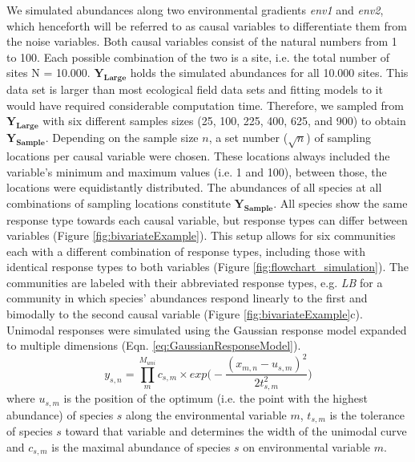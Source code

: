 \documentclass[a4paper,11pt]{article}
\begin{document}
		We simulated abundances along two environmental gradients \textit{env1} and \textit{env2}, which henceforth will be referred to as causal variables to differentiate them from the noise variables.  
        Both causal variables consist of the natural numbers from 1 to 100. 
        Each possible combination of the two is a site, i.e. the total number of sites N = 10.000.
		$\mathbf{Y_{Large}}$ holds the simulated abundances for all 10.000 sites.
	    This data set is larger than most ecological field data sets and fitting models to it would have required considerable computation time.
	    Therefore, we sampled from $\mathbf{Y_{Large}}$ with six different samples sizes (25, 100, 225, 400, 625, and 900) to obtain $\mathbf{Y_{Sample}}$.
        Depending on the sample size $n$, a set number ($\sqrt{n}$) of sampling locations per causal variable were chosen. 
        These locations always included the variable's minimum and maximum values (i.e. 1 and 100), between those, the locations were equidistantly distributed.
		The abundances of all species at all combinations of sampling locations constitute $\mathbf{Y_{Sample}}$.
		All species show the same response type towards each causal variable, but response types can differ between variables (Figure \ref{fig:bivariateExample}). 
		This setup allows for six communities each with a different combination of response types, including those with identical response types to both variables (Figure \ref{fig:flowchart_simulation}).  
		The communities are labeled with their abbreviated response types, e.g. \textit{LB} for a community  in which species' abundances respond linearly to the first and bimodally to the second causal variable (Figure \ref{fig:bivariateExample}c). \\
		Unimodal responses were simulated using the Gaussian response model \citep{GauchJr1972} expanded to multiple dimensions (Eqn. \ref{eq:GaussianResponseModel}).
		\begin{equation} \label{eq:GaussianResponseModel}
					y_{s, n} = \prod_{m}^{M_{uni}} c_{s,m} \times exp\bigg(-\frac{(x_{m,n} - u_{s,m})^2}{2t^2_{s,m}}\bigg)		
		\end{equation}
    	where $u_{s,m}$ is the position of the optimum (i.e. the point with the highest abundance) of species $s$ along the environmental variable $m$, $t_{s, m}$ is the tolerance of species $s$ toward that variable and determines the width of the unimodal curve and $c_{s,m}$ is the maximal abundance of species $s$ on environmental variable $m$. 
\end{document}
